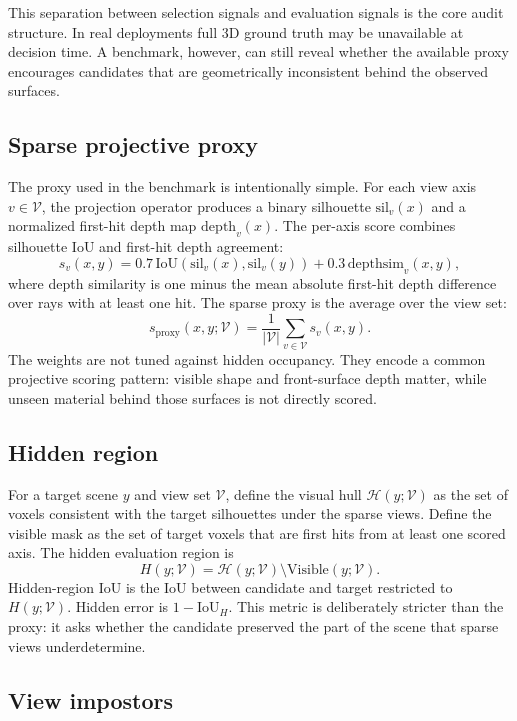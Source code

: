 \documentclass{article}
\newcommand{\views}{\mathcal{V}}
\newcommand{\vhull}{\mathcal{H}}
\begin{document}
This separation between selection signals and evaluation signals is the core
audit structure. In real deployments full 3D ground truth may be unavailable
at decision time. A benchmark, however, can still reveal whether the available
proxy encourages candidates that are geometrically inconsistent behind the
observed surfaces.

\subsection{Sparse projective proxy}

The proxy used in the benchmark is intentionally simple. For each view axis
$v \in \views$, the projection operator produces a binary silhouette
$\mathrm{sil}_v(x)$ and a normalized first-hit depth map
$\mathrm{depth}_v(x)$. The per-axis score combines silhouette IoU and first-hit
depth agreement:
\[
s_v(x,y)=0.7\,\mathrm{IoU}(\mathrm{sil}_v(x),\mathrm{sil}_v(y))
 +0.3\,\mathrm{depthsim}_v(x,y),
\]
where depth similarity is one minus the mean absolute first-hit depth
difference over rays with at least one hit. The sparse proxy is the average
over the view set:
\[
s_{\mathrm{proxy}}(x,y;\views)=\frac{1}{|\views|}\sum_{v\in\views}s_v(x,y).
\]
The weights are not tuned against hidden occupancy. They encode a common
projective scoring pattern: visible shape and front-surface depth matter, while
unseen material behind those surfaces is not directly scored.

\subsection{Hidden region}

For a target scene $y$ and view set $\views$, define the visual hull
$\vhull(y;\views)$ as the set of voxels consistent with the target silhouettes
under the sparse views. Define the visible mask as the set of target voxels
that are first hits from at least one scored axis. The hidden evaluation region
is
\[
H(y;\views)=\vhull(y;\views)\setminus \mathrm{Visible}(y;\views).
\]
Hidden-region IoU is the IoU between candidate and target restricted to
$H(y;\views)$. Hidden error is $1-\mathrm{IoU}_H$. This metric is deliberately
stricter than the proxy: it asks whether the candidate preserved the part of
the scene that sparse views underdetermine.

\subsection{View impostors}
\end{document}
